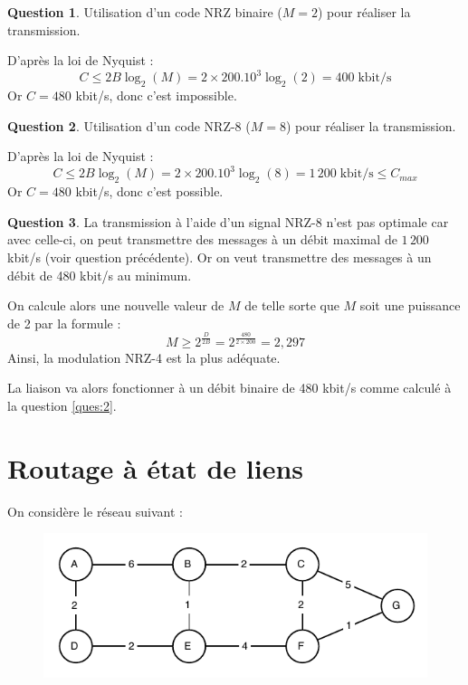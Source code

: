 \documentclass[11pt,english,french]{scrreprt}
\theoremstyle{remark}
\theoremstyle{definition}
\newtheorem{ques}{Question}[section]
\begin{document}
\begin{ques}
	Utilisation d'un code NRZ binaire ($M=2$) pour réaliser la transmission.
	
	D'après la loi de Nyquist :\[C \leqslant 2B\log_2(M) = 2\times 200.10^3\log_2(2) = 400\;\textrm{kbit/s}\]
	Or $C=480$ kbit/s, donc c'est impossible.
\end{ques}

\begin{ques}
	Utilisation d'un code NRZ-8 ($M=8$) pour réaliser la transmission.
	
	D'après la loi de Nyquist : \[C \leqslant 2B\log_2(M) = 2\times 200.10^3\log_2(8) = 1\,200\;\textrm{kbit/s} \leqslant C_{max}\]
	Or $C=480$ kbit/s, donc c'est possible.
\end{ques}

\begin{ques}
	La transmission à l'aide d'un signal NRZ-8 n'est pas optimale car avec celle-ci, on peut transmettre des messages à un débit maximal de $1\,200$ kbit/s (voir question précédente). Or on veut transmettre des messages à un débit de 480 kbit/s au minimum.
	
	On calcule alors une nouvelle valeur de $M$ de telle sorte que $M$ soit une puissance de 2 par la formule :
	\[M\geqslant 2^{\frac{D}{2B}} = 2^{\frac{480}{2\times 200}} = 2,297\]
	Ainsi, la modulation NRZ-4 est la plus adéquate.
	
	La liaison va alors fonctionner à un débit binaire de 480 kbit/s comme calculé à la question \ref{ques:2}.
\end{ques}

\section{Routage à état de liens} %

On considère le réseau suivant :
\begin{figure}[h]
	\center
	\includegraphics[scale=1]{Exam2009/graphe1}
\end{figure}
\end{document}
